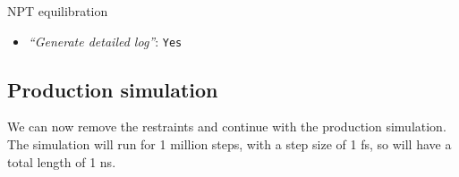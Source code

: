 \documentclass[twocolumn]{bmcart}%
\providecommand{\tightlist}{%
  \setlength{\itemsep}{0pt}\setlength{\parskip}{0pt}}
\begin{document}
\begin{handson_box_colour}{NPT
equilibration}
\begin{itemize}
\begin{itemize}
      \begin{itemize}
      \tightlist
      \item
        \emph{``Bond constraints (constraints)''}:
        \texttt{All\ bonds\ (all-bonds).}
      \item
        \emph{``Temperature /K''}: \texttt{300}
      \item
        \emph{``Step length in ps''}: \texttt{0.002}
      \item
        \emph{``Number of steps that elapse between saving data points
        (velocities, forces, energies)''}: \texttt{1000}
      \item
        \emph{``Number of steps for the simulation''}: \texttt{50000}
      \end{itemize}
    \end{itemize}
  \item
    \emph{``Generate detailed log''}: \texttt{Yes}
  \end{itemize}

\end{handson_box_colour}


\subsection*{Production simulation}\label{production-simulation}

We can now remove the restraints and continue with the production simulation. The simulation will run for 1 million steps, with a step size of 1 fs, so will have a total length of 1 ns.
\end{document}
